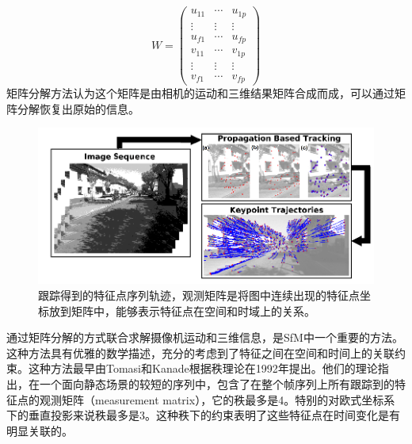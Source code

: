 \begin{equation}\label{eq:measurementMatrix}
W=
\begin{pmatrix}
u_{11}& \cdots & u_{1p}\\
\vdots& \vdots &\vdots\\
u_{f1}& \cdots & u_{fp}\\
v_{11}& \cdots & v_{1p}\\
\vdots& \vdots &\vdots\\
v_{f1}& \cdots & v_{fp}
\end{pmatrix}
\end{equation}
矩阵分解方法认为这个矩阵是由相机的运动和三维结果矩阵合成而成，可以通过矩阵分解恢复出原始的信息。

\begin{figure}[htbp]
	\includegraphics[width=1\textwidth]{figs/1-3/feature_trajectory.png} 
	\caption{跟踪得到的特征点序列轨迹\cite{Fanani2016Keypoint}，观测矩阵是将图中连续出现的特征点坐标放到矩阵中，能够表示特征点在空间和时域上的关系。}
	\label{fig:feature_trajectory}
\end{figure}

通过矩阵分解的方式联合求解摄像机运动和三维信息，是SfM中一个重要的方法。这种方法具有优雅的数学描述，充分的考虑到了特征之间在空间和时间上的关联约束。这种方法最早由Tomasi和Kanade\cite{Tomasi1992Shape}根据秩理论在1992年提出。他们的理论指出，在一个面向静态场景的较短的序列中，包含了在整个帧序列上所有跟踪到的特征点的观测矩阵（measurement matrix），它的秩最多是4。特别的对欧式坐标系下的垂直投影来说秩最多是3\cite{Costeira1995A,Tomasi1992Shape,Irani2002Multi,Liu2011Subspace}。这种秩下的约束表明了这些特征点在时间变化是有明显关联的。
